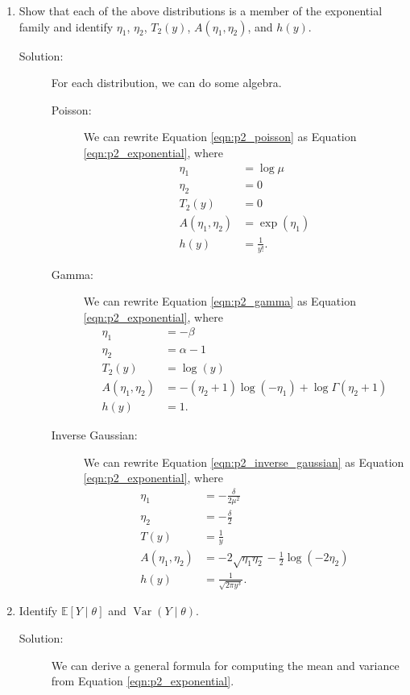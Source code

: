 \documentclass[letterpaper,11pt]{article}
\begin{document}
\begin{enumerate}
  \begin{enumerate}
  \item Show that each of the above distributions is a member of the exponential
    family and identify $\eta_1$, $\eta_2$, $T_2(y)$,
    $A\left(\eta_1,\eta_2\right)$, and $h(y)$.
    \label{part:p2a}
    \begin{description}
    \item[Solution:] For each distribution, we can do some algebra.
      
      \begin{description}
      \item[Poisson:] We can rewrite Equation \ref{eqn:p2_poisson} as Equation
        \ref{eqn:p2_exponential}, where
        \begin{align*}
          \eta_1 &= \log\mu \\
          \eta_2 &= 0 \\
          T_2(y) &= 0 \\          
          A\left(\eta_1,\eta_2\right) &= \exp(\eta_1) \\
          h(y) &= \frac{1}{y!}.
        \end{align*}
      \item[Gamma:] We can rewrite Equation \ref{eqn:p2_gamma} as Equation
        \ref{eqn:p2_exponential}, where
        \begin{align*}
          \eta_1 &= -\beta \\
          \eta_2 &= \alpha - 1 \\
          T_2(y) &= \log(y) \\
          A\left(\eta_1,\eta_2\right)
                 &=-\left(\eta_2 + 1\right)\log\left(-\eta_1\right) +
                   \log\Gamma\left(\eta_2 + 1\right)\\
          h(y) &= 1.
        \end{align*}
      \item[Inverse Gaussian:] We can rewrite Equation \ref{eqn:p2_inverse_gaussian} as
        Equation \ref{eqn:p2_exponential}, where
        \begin{align*}
          \eta_1 &= -\frac{\delta}{2\mu^2} \\
          \eta_2 &= -\frac{\delta}{2} \\
          T(y) &= \frac{1}{y} \\
          A\left(\eta_1,\eta_2\right)
                 &= -2\sqrt{\eta_1\eta_2} -
                   \frac{1}{2}\log\left(-2\eta_2\right) \\
          h(y) &= \frac{1}{\sqrt{2\pi y^3}}.
        \end{align*}
      \end{description}      
    \end{description}
  \item Identify $\mathbb{E}\left[Y \mid \theta\right]$ and
    $\operatorname{Var}\left(Y \mid \theta\right)$.
    \begin{description}
    \item[Solution:] We can derive a general formula for computing the mean and
      variance from Equation \ref{eqn:p2_exponential}.


\end{description}
\end{enumerate}
\end{enumerate}
\end{document}
